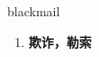 
\begin{frame}
{\huge blackmail}
\begin{center}
\begin{enumerate}\Large
  \item \textbf{欺诈，勒索}
\end{enumerate}
\end{center}
\end{frame}
